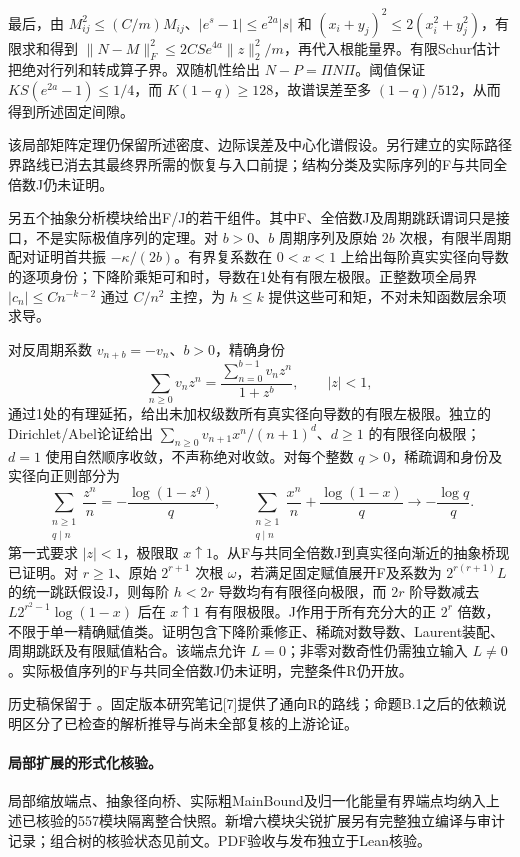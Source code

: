 \documentclass[UTF8,11pt,fontset=fandol]{ctexart}
\begin{document}
最后，由 $M_{ij}^2\le(C/m)M_{ij}$、$|e^s-1|\le e^{2a}|s|$ 和 $(x_i+y_j)^2\le2(x_i^2+y_j^2)$，有限求和得到
$\|N-M\|_F^2\le2CS e^{4a}\|z\|_2^2/m$，再代入根能量界。有限Schur估计把绝对行列和转成算子界。双随机性给出 $N-P=\Pi N\Pi$。阈值保证 $KS(e^{2a}-1)\le1/4$，而 $K(1-q)\ge128$，故谱误差至多 $(1-q)/512$，从而得到所述固定间隙。

该局部矩阵定理仍保留所述密度、边际误差及中心化谱假设。另行建立的实际路径界路线已消去其最终界所需的恢复与入口前提；结构分类及实际序列的F与共同全倍数J仍未证明。

另五个抽象分析模块给出F/J的若干组件。其中F、全倍数J及周期跳跃谓词只是接口，不是实际极值序列的定理。对 $b>0$、$b$ 周期序列及原始 $2b$ 次根，有限半周期配对证明首共振 $-\kappa/(2b)$。有界复系数在 $0<x<1$ 上给出每阶真实实径向导数的逐项身份；下降阶乘矩可和时，导数在1处有有限左极限。正整数项全局界 $|c_n|\le Cn^{-k-2}$ 通过 $C/n^2$ 主控，为 $h\le k$ 提供这些可和矩，不对未知函数层余项求导。

对反周期系数 $v_{n+b}=-v_n$、$b>0$，精确身份
\[
 \sum_{n\ge0}v_nz^n=\frac{\sum_{n=0}^{b-1}v_nz^n}{1+z^b},\qquad |z|<1,
\]
通过1处的有理延拓，给出未加权级数所有真实径向导数的有限左极限。独立的Dirichlet/Abel论证给出 $\sum_{n\ge0}v_{n+1}x^n/(n+1)^d$、$d\ge1$ 的有限径向极限；$d=1$ 使用自然顺序收敛，不声称绝对收敛。对每个整数 $q>0$，稀疏调和身份及实径向正则部分为
\[
 \sum_{\substack{n\ge1\\q\mid n}}\frac{z^n}{n}=-\frac{\log(1-z^q)}q,\qquad
 \sum_{\substack{n\ge1\\q\mid n}}\frac{x^n}{n}+\frac{\log(1-x)}q
 \longrightarrow-\frac{\log q}q.
\]
第一式要求 $|z|<1$，极限取 $x\uparrow1$。从F与共同全倍数J到真实径向渐近的抽象桥现已证明。对 $r\ge1$、原始 $2^{r+1}$ 次根 $\omega$，若满足固定赋值展开F及系数为 $2^{r(r+1)}L$ 的统一跳跃假设J，则每阶 $h<2r$ 导数均有有限径向极限，而 $2r$ 阶导数减去 $L2^{r^2-1}\log(1-x)$ 后在 $x\uparrow1$ 有有限极限。J作用于所有充分大的正 $2^r$ 倍数，不限于单一精确赋值类。证明包含下降阶乘修正、稀疏对数导数、Laurent装配、周期跳跃及有限赋值粘合。该端点允许 $L=0$；非零对数奇性仍需独立输入 $L\ne0$。实际极值序列的F与共同全倍数J仍未证明，完整条件R仍开放。

历史稿保留于 。固定版本研究笔记[7]提供了通向R的路线；命题B.1之后的依赖说明区分了已检查的解析推导与尚未全部复核的上游论证。


\paragraph{局部扩展的形式化核验。} 局部缩放端点、抽象径向桥、实际粗MainBound及归一化能量有界端点均纳入上述已核验的557模块隔离整合快照。新增六模块尖锐扩展另有完整独立编译与审计记录；组合树的核验状态见前文。PDF验收与发布独立于Lean核验。
\end{document}
